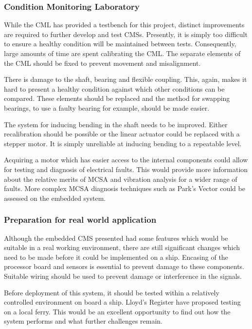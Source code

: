 \subsubsection{Condition Monitoring Laboratory}

While the CML has provided a testbench for this project, distinct improvements are required to further develop and test CMSs.
Presently, it is simply too difficult to ensure a healthy condition will be maintained between tests.
Consequently, large amounts of time are spent calibrating the CML.
The separate elements of the CML should be fixed to prevent movement and misalignment.
\par

There is damage to the shaft, bearing and flexible coupling.
This, again, makes it hard to present a healthy condition against which other conditions can be compared.
These elements should be replaced and the method for swapping bearings, to use a faulty bearing for example, should be made easier.
\par

The system for inducing bending in the shaft needs to be improved.
Either recalibration should be possible or the linear actuator could be replaced with a stepper motor.
It is simply unreliable at inducing bending to a repeatable level.
\par

Acquiring a motor which has easier access to the internal components could allow for testing and diagnosis of electrical faults.
This would provide more information about the relative merits of MCSA and vibration analysis for a wider range of faults.
More complex MCSA diagnosis techniques such as Park's Vector could be assessed on the embedded system.

\subsubsection{Preparation for real world application}

Although the embedded CMS presented had some features which would be suitable in a real working environment, there are still significant changes which need to be made before it could be implemented on a ship.
Encasing of the processor board and sensors is essential to prevent damage to these components.
Suitable wiring should be used to prevent damage or interference in the signals.
\par

Before deployment of this system, it should be tested within a relatively controlled environment on board a ship.
Lloyd's Register have proposed testing on a local ferry.
This would be an excellent opportunity to find out how the system performs and what further challenges remain.
\par

